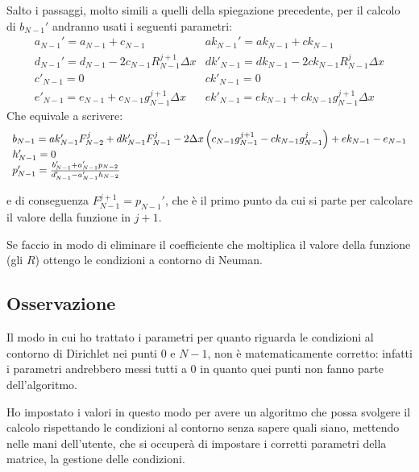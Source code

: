 Salto i passaggi, molto simili a quelli della spiegazione precedente,
per il calcolo di $b_{N-1}'$ andranno usati i seguenti parametri:
\begin{equation}
  \begin{array}{ll}
    a_{N-1}' = a_{N-1}+c_{N-1} & ak_{N-1}' = ak_{N-1}+ck_{N-1}\\
    d_{N-1}' = d_{N-1} - 2 c_{N-1} R_{N-1}^{j+1}\Delta x& dk'_{N-1} = dk_{N-1} - 2 ck_{N-1} R_{N-1}^{j}\Delta x\\
    c'_{N-1} = 0 & ck'_{N-1}= 0\\
    e'_{N-1} = e_{N-1} + c_{N-1} g^{j+1}_{N-1}\Delta x & ek'_{N-1} = ek_{N-1} + ck_{N-1} g^{j+1}_{N-1}\Delta x
  \end{array}
\end{equation}
Che equivale a scrivere:
\begin{equation}
  \begin{array}{l}
    b_{N-1} = ak_{N-1}' F_{N-2}^j + dk'_{N-1} F_{N-1}^j - 2 \Delta x \left( c_{N-1} g^{j+1}_{N-1}-ck_{N-1} g^j_{N-1} \right) + ek_{N-1} - e_{N-1} \\
    h_{N-1}' = 0\\
    p_{N-1}' = \frac{b_{N-1}' + a_{N-1}'p_{N-2}}{d_{N-1}' - a_{N-1}'h_{N-2}}
  \end{array}
\end{equation}

e di conseguenza $F_{N-1}^{j+1} = p_{N-1}'$, che \`e il primo punto da cui si parte per calcolare il valore della funzione in $j+1$.

Se faccio in modo di eliminare il coefficiente che moltiplica il valore della funzione (gli $R$) ottengo le condizioni a  contorno di Neuman.
\subsection{Osservazione}
Il modo in cui ho trattato i parametri per quanto riguarda le condizioni al contorno di Dirichlet nei punti $0$ e $N-1$, non \`e matematicamente corretto: infatti i parametri andrebbero messi tutti a 0 in quanto quei punti non fanno parte dell'algoritmo.

Ho impostato i valori in questo modo per avere un algoritmo che possa svolgere il calcolo rispettando le condizioni al contorno senza sapere quali siano, mettendo nelle mani dell'utente, che si occuper\`a di impostare i corretti parametri della matrice, la gestione delle condizioni.
